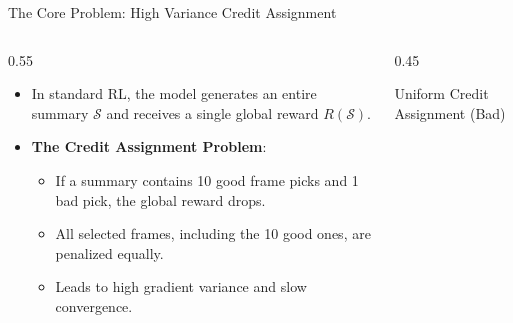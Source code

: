 \documentclass[aspectratio=169]{beamer}
\begin{document}
\begin{frame}{The Core Problem: High Variance Credit Assignment}
    \begin{columns}
        \begin{column}{0.55\textwidth}
            \begin{itemize}
                \item In standard RL, the model generates an entire summary $\mathcal{S}$ and receives a single global reward $R(\mathcal{S})$.
                \item \textbf{The Credit Assignment Problem}:
                \begin{itemize}
                    \item If a summary contains 10 good frame picks and 1 bad pick, the global reward drops.
                    \item All selected frames, including the 10 good ones, are penalized equally.
                    \item Leads to high gradient variance and slow convergence.
                \end{itemize}
            \end{itemize}
        \end{column}
        \begin{column}{0.45\textwidth}
            \begin{block}{Uniform Credit Assignment (Bad)}
                \centering
            \end{block}
        \end{column}
    \end{columns}
\end{frame}
\end{document}
